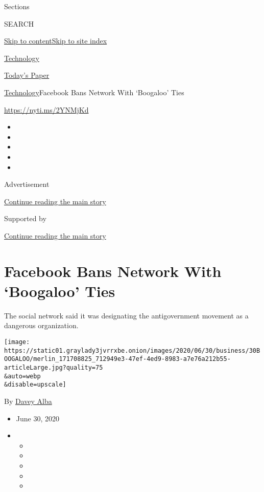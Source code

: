 Sections

SEARCH

\protect\hyperlink{site-content}{Skip to
content}\protect\hyperlink{site-index}{Skip to site index}

\href{https://www.nytimes3xbfgragh.onion/section/technology}{Technology}

\href{https://myaccount.nytimes3xbfgragh.onion/auth/login?response_type=cookie\&client_id=vi}{}

\href{https://www.nytimes3xbfgragh.onion/section/todayspaper}{Today's
Paper}

\href{/section/technology}{Technology}\textbar{}Facebook Bans Network
With `Boogaloo' Ties

\url{https://nyti.ms/2YNMjKd}

\begin{itemize}
\item
\item
\item
\item
\item
\end{itemize}

Advertisement

\protect\hyperlink{after-top}{Continue reading the main story}

Supported by

\protect\hyperlink{after-sponsor}{Continue reading the main story}

\hypertarget{facebook-bans-network-with-boogaloo-ties}{%
\section{Facebook Bans Network With `Boogaloo'
Ties}\label{facebook-bans-network-with-boogaloo-ties}}

The social network said it was designating the antigovernment movement
as a dangerous organization.

\texttt{[image: https://static01.graylady3jvrrxbe.onion/images/2020/06/30/business/30BOOGALOO/merlin\_171708825\_712949e3-47ef-4ed9-8983-a7e76a212b55-articleLarge.jpg?quality=75\\\&auto=webp\\\&disable=upscale]}

By \href{https://www.nytimes3xbfgragh.onion/by/davey-alba}{Davey Alba}

\begin{itemize}
\item
  June 30, 2020
\item
  \begin{itemize}
  \item
  \item
  \item
  \item
  \item
  \end{itemize}
\end{itemize}

